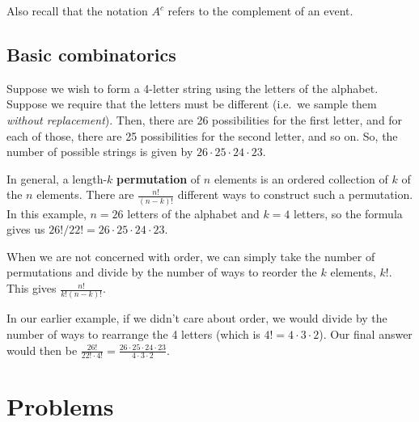 \documentclass[12pt]{article}
\begin{document}
    Also recall that the notation $A^c$ refers to the complement of an event.

    \subsection*{Basic combinatorics}

    Suppose we wish to form a 4-letter string using the letters of the
    alphabet. Suppose we require that the letters must be different (i.e.\ we
    sample them \textit{without replacement}).  Then, there are 26
    possibilities for the first letter, and for each of those, there are 25
    possibilities for the second letter, and so on.  So, the number of possible
    strings is given by $26 \cdot 25 \cdot 24 \cdot 23$.

    In general, a length-$k$ \textbf{permutation} of $n$ elements is an ordered
    collection of $k$ of the $n$ elements. There are $\frac{n!}{(n-k)!}$
    different ways to construct such a permutation. In this example, $n=26$
    letters of the alphabet and $k=4$ letters, so the formula gives us $26!/22!
    = 26 \cdot 25 \cdot 24 \cdot 23$.

    When we are not concerned with order, we can simply take the number of
    permutations and divide by the number of ways to reorder the $k$ elements,
    $k!$. This gives $\frac{n!}{k!(n-k)!}$.

    In our earlier example, if we didn't care about order, we would divide by
    the number of ways to rearrange the 4 letters (which is $4! = 4 \cdot 3 \cdot
    2$). Our final answer would then be $\frac{26!}{22! \cdot 4!} = \frac{26
    \cdot 25 \cdot 24 \cdot 23}{4 \cdot 3 \cdot 2}$.

    \clearpage
    \section*{Problems}
\end{document}
